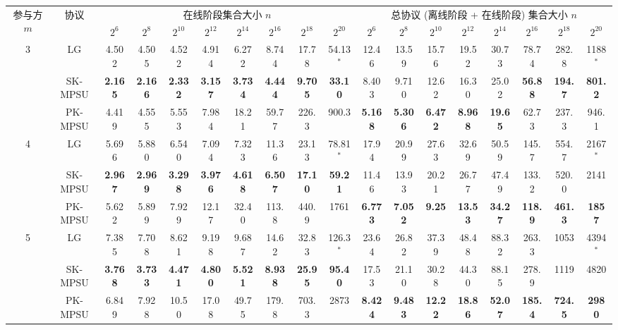 \begin{table}[p]
\centering
\vspace*{\fill}

\begin{adjustbox}{angle=90,center,scale=0.85}
\begin{tabular}{|c|c|*{16}{c|}}
\hline
\multirow{2}{*}{参与方 $m$} & \multirow{2}{*}{协议} & \multicolumn{8}{c|}{在线阶段集合大小 $n$} & \multicolumn{8}{c|}{总协议 (离线阶段 + 在线阶段) 集合大小 $n$} \\ \cline{3-18} 
 & & $2^6$ & $2^8$ & $2^{10}$ & $2^{12}$ & $2^{14}$ & $2^{16}$ & $2^{18}$ & $2^{20}$ & $2^6$ & $2^8$ & $2^{10}$ & $2^{12}$ & $2^{14}$ & $2^{16}$ & $2^{18}$ & $2^{20}$ \\ \hline
\multirow{3}{*}{3}  
 & LG & 4.502 & 4.505 & 4.522 & 4.914 & 6.272 & 8.744 & 17.78 & 54.13$^*$ & 12.46 & 13.59 & 15.76 & 19.52 & 30.73 & 78.74 & 282.8 & 1188$^*$ \\ \cline{2-18} 
 & SK-MPSU & \textbf{2.165} & \textbf{2.166} & \textbf{2.332} & \textbf{3.157} & \textbf{3.734} & \textbf{4.444} & \textbf{9.705} & \textbf{33.10} & 8.403 & 9.710 & 12.62 & 16.30 & 25.02 & \textbf{56.88} & \textbf{194.7} & \textbf{801.2} \\ \cline{2-18} 
 & PK-MPSU & 4.419 & 4.555 & 5.553 & 7.984 & 18.21 & 59.77 & 226.3 & 900.3 & \textbf{5.168} & \textbf{5.306} & \textbf{6.472} & \textbf{8.968} & \textbf{19.65} & 62.73 & 237.3 & 946.1 \\ \hline

\multirow{3}{*}{4}   
 & LG & 5.696 & 5.880 & 6.540 & 7.094 & 7.323 & 11.36 & 23.13 & 78.81$^*$ & 17.94 & 20.99 & 27.63 & 32.69 & 50.59 & 145.7 & 554.7 & 2167$^*$ \\ \cline{2-18} 
 & SK-MPSU & \textbf{2.967} & \textbf{2.969} & \textbf{3.298} & \textbf{3.976} & \textbf{4.618} & \textbf{6.507} & \textbf{17.10} & \textbf{59.21} & 11.46 & 13.93 & 20.21 & 26.77 & 47.49 & 133.2 & 520.0 & 2141 \\ \cline{2-18} 
 & PK-MPSU & 5.622 & 5.899 & 7.929 & 12.17 & 32.40 & 113.8 & 440.9 & 1761 & \textbf{6.773} & \textbf{7.052} & \textbf{9.25} & \textbf{13.53} & \textbf{34.27} & \textbf{118.9} & \textbf{461.3} & \textbf{1857} \\ \hline

\multirow{3}{*}{5}  
 & LG & 7.385 & 7.708 & 8.621 & 9.198 & 9.687 & 14.62 & 32.83 & 126.3$^*$ & 23.64 & 26.82 & 37.39 & 48.48 & 88.32 & 263.3 & 1053 & 4394$^*$ \\ \cline{2-18} 
 & SK-MPSU & \textbf{3.768} & \textbf{3.733} & \textbf{4.471} & \textbf{4.800} & \textbf{5.521} & \textbf{8.938} & \textbf{25.95} & \textbf{95.40} & 17.53 & 21.10 & 30.28 & 44.30 & 88.15 & 278.9 & 1119 & 4820 \\ \cline{2-18} 
 & PK-MPSU & 6.849 & 7.928 & 10.50 & 17.08 & 49.75 & 179.8 & 703.3 & 2873 & \textbf{8.424} & \textbf{9.483} & \textbf{12.22} & \textbf{18.86} & \textbf{52.07} & \textbf{185.4} & \textbf{724.5} & \textbf{2980} \\ \hline


\end{tabular}
\end{adjustbox}
\end{table}
